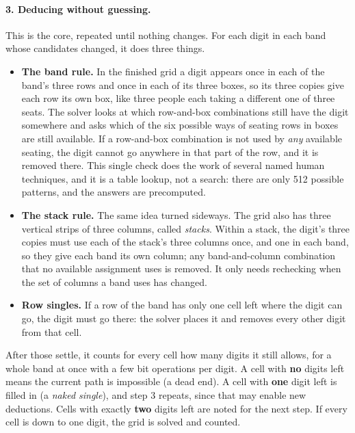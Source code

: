 \documentclass[11pt]{article}
\begin{document}
\paragraph{3. Deducing without guessing.} This is the core, repeated until nothing changes. For each digit in each band
whose candidates changed, it does three things.
\begin{itemize}
\item \textbf{The band rule.} In the finished grid a digit appears once in each of the band's three rows and once in
  each of its three boxes, so its three copies give each row its own box, like three people each taking a different one
  of three seats. The solver looks at which row-and-box combinations still have the digit somewhere and asks which of
  the six possible ways of seating rows in boxes are still available. If a row-and-box combination is not used by
  \emph{any} available seating, the digit cannot go anywhere in that part of the row, and it is removed there. This
  single check does the work of several named human techniques, and it is a table lookup, not a search: there are only
  512 possible patterns, and the answers are precomputed.
\item \textbf{The stack rule.} The same idea turned sideways. The grid also has three vertical strips of three columns,
  called \emph{stacks}. Within a stack, the digit's three copies must use each of the stack's three columns once, and
  one in each band, so they give each band its own column; any band-and-column combination that no available assignment
  uses is removed. It only needs rechecking when the set of columns a band uses has changed.
\item \textbf{Row singles.} If a row of the band has only one cell left where the digit can go, the digit must go
  there: the solver places it and removes every other digit from that cell.
\end{itemize}
After those settle, it counts for every cell how many digits it still allows, for a whole band at once with a few bit
operations per digit. A cell with \textbf{no} digits left means the current path is impossible (a dead end). A cell
with \textbf{one} digit left is filled in (a \emph{naked single}), and step 3 repeats, since that may enable new
deductions. Cells with exactly \textbf{two} digits left are noted for the next step. If every cell is down to one digit,
the grid is solved and counted.
\end{document}
